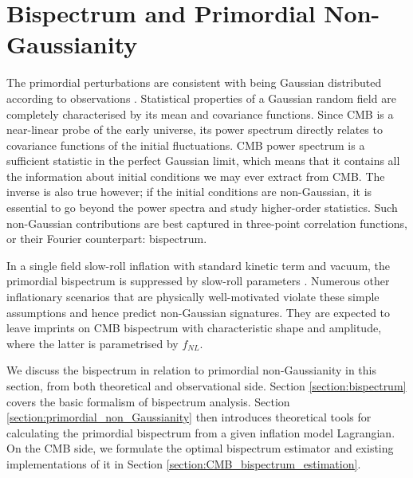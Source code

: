 \chapter{Bispectrum and Primordial Non-Gaussianity}

\ifpdf
    \graphicspath{{Chapter3/Figs/Raster/}{Chapter3/Figs/PDF/}{Chapter3/Figs/}}
\else
    \graphicspath{{Chapter3/Figs/Vector/}{Chapter3/Figs/}}
\fi

The primordial perturbations are consistent with being Gaussian distributed according to observations \cite{PlanckCollaboration2018}. Statistical properties of a Gaussian random field are completely characterised by its mean and covariance functions. Since CMB is a near-linear probe of the early universe, its power spectrum directly relates to covariance functions of the initial fluctuations. CMB power spectrum is a sufficient statistic in the perfect Gaussian limit, which means that it contains all the information about initial conditions we may ever extract from CMB. The inverse is also true however; if the initial conditions are non-Gaussian, it is essential to go beyond the power spectra and study higher-order statistics. Such non-Gaussian contributions are best captured in three-point correlation functions, or their Fourier counterpart: bispectrum.

In a single field slow-roll inflation with standard kinetic term and vacuum, the primordial bispectrum is suppressed by slow-roll parameters \cite{Maldacena2013}. Numerous other inflationary scenarios that are physically well-motivated violate these simple assumptions and hence predict non-Gaussian signatures. They are expected to leave imprints on CMB bispectrum with characteristic shape and amplitude, where the latter is parametrised by $f_{NL}$.

We discuss the bispectrum in relation to primordial non-Gaussianity in this section, from both theoretical and observational side. Section \ref{section:bispectrum} covers the basic formalism of bispectrum analysis. Section \ref{section:primordial_non_Gaussianity} then introduces theoretical tools for calculating the primordial bispectrum from a given inflation model Lagrangian. On the CMB side, we formulate the optimal bispectrum estimator and existing implementations of it in Section \ref{section:CMB_bispectrum_estimation}.


